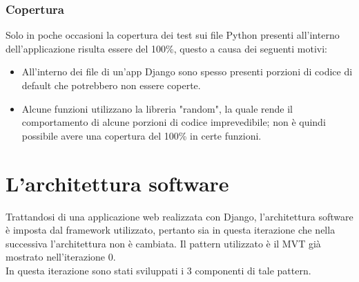 \documentclass[10pt,a4paper]{report}
\begin{document}
	\subsubsection{Copertura}
	Solo in poche occasioni la copertura dei test sui file Python presenti all'interno dell'applicazione risulta essere del 100\%, questo a causa dei seguenti motivi:
	\begin{itemize}
		\item All'interno dei file di un'app Django sono spesso presenti porzioni di codice di default che potrebbero non essere coperte.
		\item Alcune funzioni utilizzano la libreria "random", la quale rende il comportamento di alcune porzioni di codice imprevedibile; non è quindi possibile avere una copertura del 100\% in certe funzioni.
	\end{itemize}

	\section{L'architettura software}
	Trattandosi di una applicazione web realizzata con Django, l'architettura software è imposta dal framework utilizzato, pertanto sia in questa iterazione che nella successiva l'architettura non è cambiata. Il pattern utilizzato è il MVT già mostrato nell'iterazione 0. \\
	In questa iterazione sono stati sviluppati i 3 componenti di tale pattern.
\end{document}
